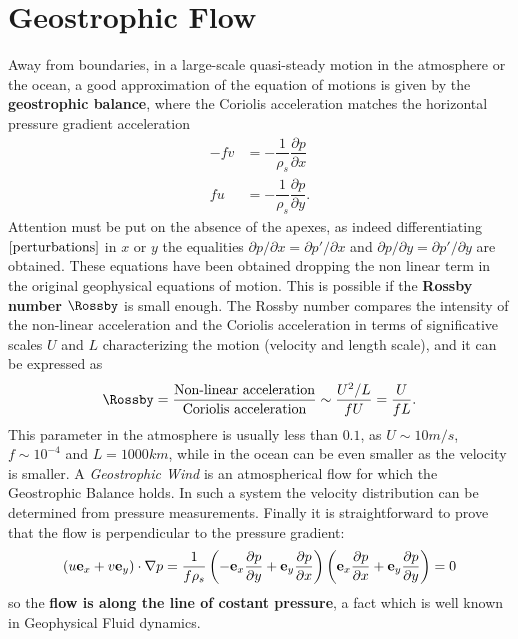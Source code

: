 \section{Geostrophic Flow}
Away from boundaries, in a large-scale quasi-steady motion in the atmosphere or the ocean, a good approximation of the equation of motions is given by the \textbf{geostrophic balance}, where the Coriolis acceleration matches the horizontal pressure gradient acceleration
\begin{align*}
-fv&=-\dfrac{1}{\rho_{s}}\dfrac{\partial p}{\partial x}\\
fu&=-\dfrac{1}{\rho_{s}}\dfrac{\partial p}{\partial y}.
\end{align*}
Attention must be put on the absence of the apexes, as indeed differentiating $\eqref{perturbations}$ in $x$ or $y$ the equalities $\partial p/\partial x = \partial p'/\partial x $ and $\partial p/\partial y = \partial p'/\partial y $ are obtained. These equations have been obtained dropping the non linear term in the original geophysical equations of motion. This is possible if the \textbf{Rossby number} $\Rossby$ is small enough. The Rossby number compares the intensity of the non-linear acceleration and the Coriolis acceleration in terms of significative scales $U$ and $L$ characterizing the motion (velocity and length scale), and it can be expressed as
\begin{equation}
\Rossby=\dfrac{\text{Non-linear acceleration}}{\text{Coriolis acceleration}}\sim\dfrac{U^{2}/L}{fU}=\dfrac{U}{fL}.
\end{equation}
This parameter in the atmosphere is usually less than $0.1$, as $U\sim10m/s$, $f\sim10^{-4}$ and $L=1000km$, while in the ocean can be even smaller as the velocity is smaller. A \textit{Geostrophic Wind} is an atmospherical flow for which the Geostrophic Balance holds. In such a system the velocity distribution can be determined from pressure measurements. Finally it is straightforward to prove that the flow is perpendicular to the pressure gradient:
\begin{equation}
\left( u\mathbf{e}_{x}  +v\mathbf{e}_{y}  \right) \cdot \nabla p = \dfrac{1}{f\rho_s}\left( -\mathbf{e}_{x}\dfrac{\partial p}{\partial y}  +\mathbf{e}_{y}\dfrac{\partial p}{\partial x}  \right)
\left( \mathbf{e}_{x}\dfrac{\partial p}{\partial x}  +\mathbf{e}_{y}\dfrac{\partial p}{\partial y}  \right)=0
\end{equation}
so the \textbf{flow is along the line of costant pressure}, a fact which is well known in Geophysical Fluid dynamics.
